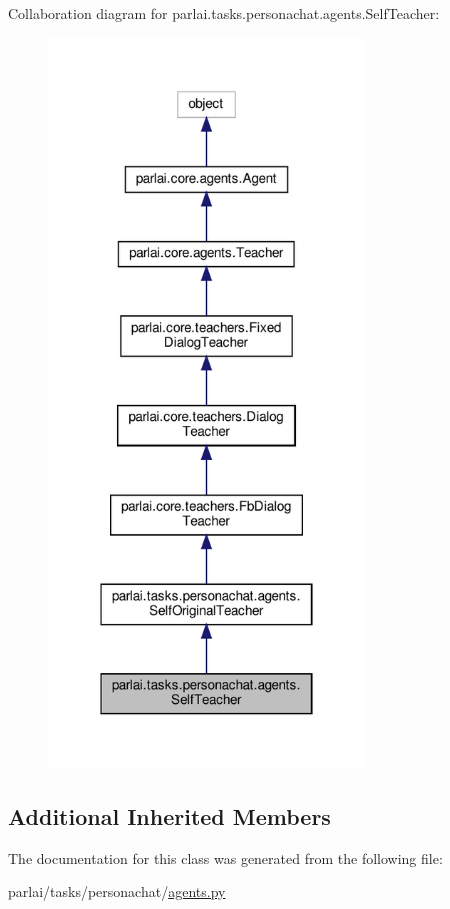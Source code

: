 Collaboration diagram for parlai.\+tasks.\+personachat.\+agents.\+Self\+Teacher\+:
\nopagebreak
\begin{figure}[H]
\begin{center}
\leavevmode
\includegraphics[width=238pt]{classparlai_1_1tasks_1_1personachat_1_1agents_1_1SelfTeacher__coll__graph}
\end{center}
\end{figure}
\subsection*{Additional Inherited Members}


The documentation for this class was generated from the following file\+:\begin{DoxyCompactItemize}
\item 
parlai/tasks/personachat/\hyperlink{parlai_2tasks_2personachat_2agents_8py}{agents.\+py}\end{DoxyCompactItemize}
